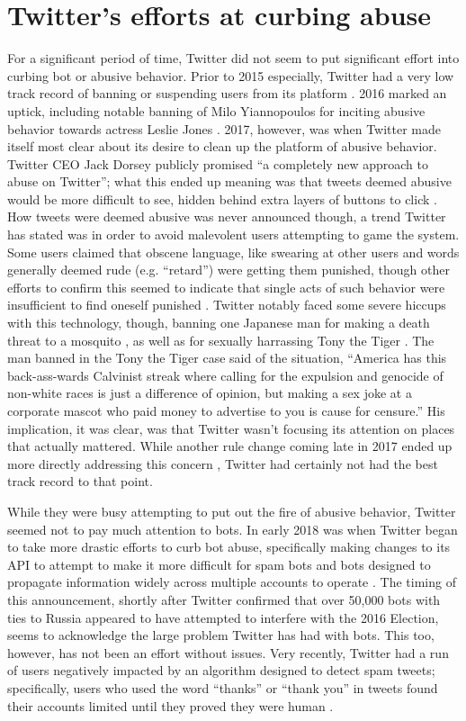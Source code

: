 \documentclass[11pt]{article}
\begin{document}
\section{Twitter's efforts at curbing abuse}
\label{twitter-efforts}
For a significant period of time, Twitter did not seem to put significant effort into curbing bot or abusive behavior. Prior to 2015 especially, Twitter had a very low track record of banning or suspending users from its platform \cite{suspensions}. 2016 marked an uptick, including notable banning of Milo Yiannopoulos for inciting abusive behavior towards actress Leslie Jones \cite{milo}. 2017, however, was when Twitter made itself most clear about its desire to clean up the platform of abusive behavior. Twitter CEO Jack Dorsey publicly promised ``a completely new approach to abuse on Twitter''; what this ended up meaning was that tweets deemed abusive would be more difficult to see, hidden behind extra layers of buttons to click \cite{abusive-twitter}. How tweets were deemed abusive was never announced though, a trend Twitter has stated was in order to avoid malevolent users attempting to game the system. Some users claimed that obscene language, like swearing at other users \cite{swears} and words generally deemed rude (e.g. ``retard'') were getting them punished, though other efforts to confirm this seemed to indicate that single acts of such behavior were insufficient to find oneself punished \cite{probably}. Twitter notably faced some severe hiccups with this technology, though, banning one Japanese man for making a death threat to a mosquito \cite{mosquito}, as well as for sexually harrassing Tony the Tiger \cite{tony}. The man banned in the Tony the Tiger case said of the situation, ``America has this back-ass-wards Calvinist streak where calling for the expulsion and genocide of non-white races is just a difference of opinion, but making a sex joke at a corporate mascot who paid money to advertise to you is cause for censure.'' His implication, it was clear, was that Twitter wasn't focusing its attention on places that actually mattered. While another rule change coming late in 2017 ended up more directly addressing this concern \cite{nazis-twitter}, Twitter had certainly not had the best track record to that point.

While they were busy attempting to put out the fire of abusive behavior, Twitter seemed not to pay much attention to bots. In early 2018 was when Twitter began to take more drastic efforts to curb bot abuse, specifically making changes to its API to attempt to make it more difficult for spam bots and bots designed to propagate information widely across multiple accounts to operate \cite{curb-bots}. The timing of this announcement, shortly after Twitter confirmed that over 50,000 bots with ties to Russia appeared to have attempted to interfere with the 2016 Election, seems to acknowledge the large problem Twitter has had with bots. This too, however, has not been an effort without issues. Very recently, Twitter had a run of users negatively impacted by an algorithm designed to detect spam tweets; specifically, users who used the word ``thanks'' or ``thank you'' in tweets found their accounts limited until they proved they were human \cite{thanks}.
\end{document}

